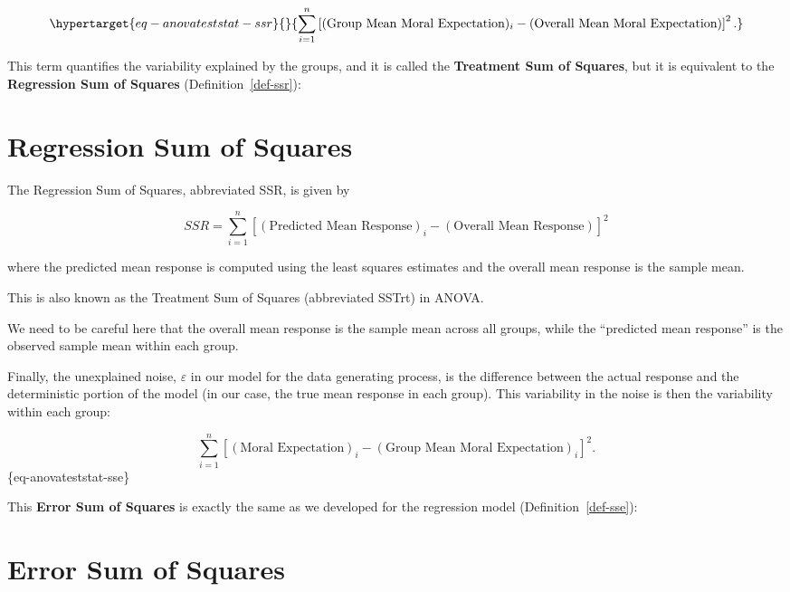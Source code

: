 \documentclass[
  letterpaper,
  DIV=11,
  numbers=noendperiod]{scrreprt}
\theoremstyle{definition}
\theoremstyle{definition}
\theoremstyle{plain}
\theoremstyle{remark}
\begin{document}
\begin{equation}\protect\hypertarget{eq-anovateststat-ssr}{}{\sum_{i=1}^{n} \left[(\text{Group Mean Moral Expectation})_i - (\text{Overall Mean Moral Expectation})\right]^2.}\label{eq-anovateststat-ssr}\end{equation}

This term quantifies the variability explained by the groups, and it is
called the \textbf{Treatment Sum of Squares}, but it is equivalent to
the \textbf{Regression Sum of Squares} (Definition~\ref{def-ssr}):

\hypertarget{regression-sum-of-squares-1}{%
\section{Regression Sum of Squares}\label{regression-sum-of-squares-1}}

The Regression Sum of Squares, abbreviated SSR, is given by

\[SSR = \sum_{i=1}^{n} \left[(\text{Predicted Mean Response})_i - (\text{Overall Mean Response})\right]^2\]

where the predicted mean response is computed using the least squares
estimates and the overall mean response is the sample mean.

This is also known as the Treatment Sum of Squares (abbreviated SSTrt)
in ANOVA.

We need to be careful here that the overall mean response is the sample
mean across all groups, while the ``predicted mean response'' is the
observed sample mean within each group.

Finally, the unexplained noise, \(\varepsilon\) in our model for the
data generating process, is the difference between the actual response
and the deterministic portion of the model (in our case, the true mean
response in each group). This variability in the noise is then the
variability within each group:

\[\sum_{i=1}^{n} \left[(\text{Moral Expectation})_i - (\text{Group Mean Moral Expectation})_i\right]^2.\]
\{eq-anovateststat-sse\}

This \textbf{Error Sum of Squares} is exactly the same as we developed
for the regression model (Definition~\ref{def-sse}):

\hypertarget{error-sum-of-squares-1}{%
\section{Error Sum of Squares}\label{error-sum-of-squares-1}}
\end{document}
